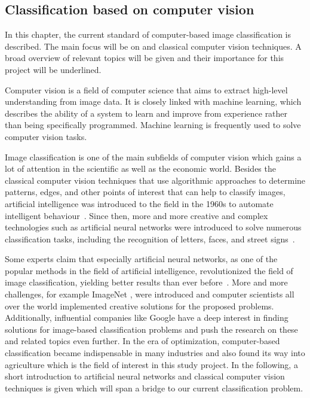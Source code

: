 \subsection{Classification based on computer vision}
\label{sec:BackgroundCV}

In this chapter, the current standard of computer-based image classification is described. The main focus will be on  and classical computer vision techniques. A broad overview of relevant topics will be given and their importance for this project will be underlined.

Computer vision is a field of computer science that aims to extract high-level understanding from image data. It is closely linked with machine learning, which describes the ability of a system to learn and improve from experience rather than being specifically programmed. Machine learning is frequently used to solve computer vision tasks.

\bigskip
Image classification is one of the main subfields of computer vision which gains a lot of attention in the scientific as well as the economic world. Besides the classical computer vision techniques that use algorithmic approaches to determine patterns, edges, and other points of interest that can help to classify images, artificial intelligence was introduced to the field in the 1960s to automate intelligent behaviour~\citep{szeliski2010computer}. Since then, more and more creative and complex technologies such as artificial neural networks were introduced to solve numerous classification tasks, including the recognition of letters, faces, and street signs~\citep{mironczuk2018recent,balaban2015deep,stallkamp2011german}.

Some experts claim that especially artificial neural networks, as one of the popular methods in the field of artificial intelligence, revolutionized the field of image classification, yielding better results than ever before~\citep{he2016deep,alexnet2012original}. More and more challenges, for example ImageNet \citep{russakovsky2015imagenet}, were introduced and computer scientists all over the world implemented creative solutions for the proposed problems. Additionally, influential companies like Google have a deep interest in finding solutions for image-based classification problems and push the research on these and related topics even further. In the era of optimization, computer-based classification became indispensable in many industries and also found its way into agriculture which is the field of interest in this study project.
In the following, a short introduction to artificial neural networks and classical computer vision techniques is given which will span a bridge to our current classification problem.


